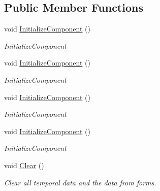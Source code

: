 \subsection*{Public Member Functions}
\begin{DoxyCompactItemize}
\item 
void \mbox{\hyperlink{class_wpf_handler_1_1_u_i_1_1_controls_1_1_logon_1_1_logon_screen_a305abd77b32a115eae52ceba8c369c3d}{Initialize\+Component}} ()
\begin{DoxyCompactList}\small\item\em Initialize\+Component \end{DoxyCompactList}\item 
void \mbox{\hyperlink{class_wpf_handler_1_1_u_i_1_1_controls_1_1_logon_1_1_logon_screen_a305abd77b32a115eae52ceba8c369c3d}{Initialize\+Component}} ()
\begin{DoxyCompactList}\small\item\em Initialize\+Component \end{DoxyCompactList}\item 
void \mbox{\hyperlink{class_wpf_handler_1_1_u_i_1_1_controls_1_1_logon_1_1_logon_screen_a305abd77b32a115eae52ceba8c369c3d}{Initialize\+Component}} ()
\begin{DoxyCompactList}\small\item\em Initialize\+Component \end{DoxyCompactList}\item 
void \mbox{\hyperlink{class_wpf_handler_1_1_u_i_1_1_controls_1_1_logon_1_1_logon_screen_a305abd77b32a115eae52ceba8c369c3d}{Initialize\+Component}} ()
\begin{DoxyCompactList}\small\item\em Initialize\+Component \end{DoxyCompactList}\item 
void \mbox{\hyperlink{class_wpf_handler_1_1_u_i_1_1_controls_1_1_logon_1_1_logon_screen_aea4275b155b6aa31830e1e492bb881b0}{Clear}} ()
\begin{DoxyCompactList}\small\item\em Clear all temporal data and the data from forms. \end{DoxyCompactList}\end{DoxyCompactItemize}
